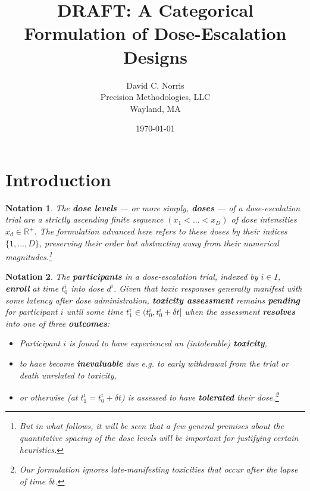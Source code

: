 \documentclass{article}
\newcommand{\R}{\mathbb{R}}
\begin{document}
\newtheorem{thm}{Theorem}[section]
\newtheorem{nota}[thm]{Notation}
\newtheorem{defn}[thm]{Definition}
\newtheorem{fact}[thm]{Fact}
\newtheorem{prop}[thm]{Proposition}
\newtheorem{lemma}[thm]{Lemma}
\newtheorem{corr}[thm]{Corrolary}
\newtheorem{conj}[thm]{Conjecture}
\newtheorem{eg}[thm]{Example}

\title{DRAFT: A Categorical Formulation of Dose-Escalation Designs}
\author{David C. Norris\\Precision Methodologies, LLC\\Wayland, MA}
\date{\today{}}

\maketitle

\section{Introduction}

\begin{nota}
  The \textbf{dose levels} --- or more simply, \textbf{doses} --- of a dose-escalation trial are a strictly ascending finite sequence $(x_1 < ... < x_D)$ of dose intensities $x_d \in \R^+$.  The formulation advanced here refers to these doses by their indices $\{1,...,D\}$, preserving their order but abstracting away from their numerical magnitudes.\footnote{But in what follows, it will be seen that a few general premises about the quantitative spacing of the dose levels will be important for justifying certain heuristics.}
\end{nota}

\begin{nota}
  The \textbf{participants} in a dose-escalation trial, indexed by $i \in I$, \textbf{enroll} at time $t_0^i$ into dose $d^i$.  Given that toxic responses generally manifest with some latency after dose administration, \textbf{toxicity assessment} remains \textbf{pending} for participant $i$ until some time $t_1^i \in (t_0^i, t_0^i + \delta t]$ when the assessment \textbf{resolves} into one of three \textbf{outcomes}:
  
  \begin{itemize}
    \item Participant $i$ is found to have experienced an (intolerable) \textbf{toxicity},
    \item to have become \textbf{inevaluable} due e.g. to early withdrawal from the trial or death unrelated to toxicity,
  \item or otherwise (at $t_1^i = t_0^i + \delta t$) is assessed to have \textbf{tolerated} their dose.\footnote{Our formulation ignores late-manifesting toxicities that occur after the lapse of time $\delta t$.}
  \end{itemize}
\end{nota}
\end{document}
